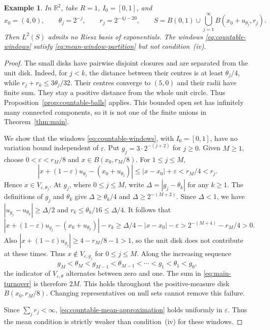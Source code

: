 \documentclass[12pt,reqno,tbtags]{amsart}
\newtheorem{example}{Example}[section]
\def\R{\mathbb{R}}
\newcommand\1{\mathbbm{1}}
\newcommand{\eps}{\varepsilon}
\begin{document}
\begin{example}\label{ex:countable-disks}
In $\R^2$, take $R=1$, $I_0=[0,1]$, and
\begin{equation}\label{eq:explicit-countable-disks}
    x_0=(4,0),\qquad \theta_j=2^{-j},\qquad r_j=2^{-4j-20},
    \qquad
    S=B(0,1)\cup\bigcup_{j=1}^{\infty}B(x_0+u_{\theta_j},r_j).
\end{equation}
Then $L^2(S)$ admits no Riesz basis of exponentials.
The windows \eqref{eq:countable-windows} satisfy
\eqref{eq:mean-window-partition} but not condition~(iv).
\end{example}
\begin{proof}
The small disks have pairwise disjoint closures and are separated from the
unit disk. Indeed, for $j<k$, the distance between their centres is at least
$\theta_j/4$, while $r_j+r_k\le3\theta_j/32$.
Their centres converge to $(5,0)$ and their radii have finite sum.
They stay a positive distance from the whole unit circle.
Thus Proposition~\ref{prop:countable-balls} applies.
This bounded open set has infinitely many connected components, so it is
not one of the finite unions in Theorem~\ref{thm:main}.

We show that the windows \eqref{eq:countable-windows}, with $I_0=[0,1]$,
have no variation bound independent of $\eps$.
Put $g_j=3\cdot2^{-(j+2)}$ for $j\ge0$.
Given $M\ge1$, choose $0<\eps<r_M/8$ and
$x\in B(x_0,r_M/8)$. For $1\le j\le M$,
\begin{equation*}
    |x+(1-\eps)u_{\theta_j}-(x_0+u_{\theta_j})|
    \le |x-x_0|+\eps<r_M/4<r_j.
\end{equation*}
Hence $x\in V_{\eps,\theta_j}$. At $g_j$, where $0\le j\le M$,
write $\Delta=|g_j-\theta_k|$ for any $k\ge1$.
The definitions of $g_j$ and $\theta_k$ give
$\Delta\ge\theta_k/4$ and $\Delta\ge2^{-(M+2)}$.
Since $\Delta<1$, we have
$|u_{g_j}-u_{\theta_k}|\ge\Delta/2$ and
$r_k\le\theta_k/16\le\Delta/4$. It follows that
\begin{equation*}
    |x+(1-\eps)u_{g_j}-(x_0+u_{\theta_k})|-r_k
    \ge\Delta/4-|x-x_0|-\eps
    >2^{-(M+4)}-r_M/4>0.
\end{equation*}
Also $|x+(1-\eps)u_{g_j}|\ge4-r_M/8-1>1$, so the unit disk does not
contribute at these times. Thus $x\notin V_{\eps,g_j}$ for $0\le j\le M$.
Along the increasing sequence
\begin{equation*}
    g_M<\theta_M<g_{M-1}<\theta_{M-1}<\cdots<g_1<\theta_1<g_0,
\end{equation*}
the indicator of $V_{\eps,\theta}$ alternates between zero and one.
The sum in \eqref{eq:main-turnover} is therefore $2M$.
This holds throughout the positive-measure disk
$B(x_0,r_M/8)$. Changing representatives on null sets cannot remove this failure.

Since $\sum_j r_j<\infty$, \eqref{eq:countable-mean-approximation} holds
uniformly in $\eps$. Thus the mean condition is strictly weaker than
condition~(iv) for these windows.
\end{proof}
\end{document}
